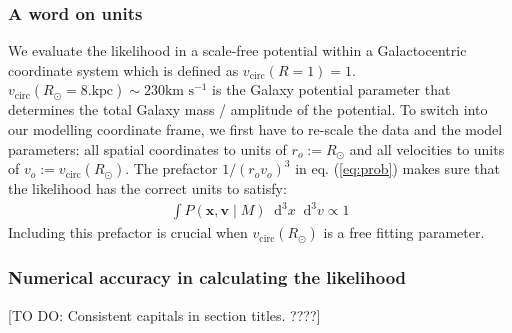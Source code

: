\documentclass[12pt,preprint]{aastex}
\newcommand{\vect}[1]{\boldsymbol{#1}} %
\newcommand*\Diff[1]{\mathop{}\!\mathrm{d^#1}}
\begin{document}
\subsubsection{A word on units}

We evaluate the likelihood in a scale-free potential within a Galactocentric coordinate system which is defined as $v_\text{circ}(R = 1) = 1$. $v_\text{circ}(R_\odot = 8. \text{kpc}) \sim 230 \text{km s$^{-1}$}$ is the Galaxy potential parameter that determines the total Galaxy mass / amplitude of the potential. To switch into our modelling coordinate frame, we first have to re-scale the data and the model parameters: all spatial coordinates to units of $r_o := R_\odot$ and all velocities to units of $v_o := v_\text{circ}(R_\odot )$. The prefactor $1/\left(r_o v_o\right)^3$ in eq. (\ref{eq:prob}) makes sure that the likelihood has the correct units to satisfy:
\begin{eqnarray*}
\int P(\vect{x},\vect{v} \mid M) \Diff 3 x \Diff 3 v \propto 1
\end{eqnarray*} 
Including this prefactor is crucial when $v_\text{circ}(R_\odot )$ is a free fitting parameter.

\subsubsection{Numerical accuracy in calculating the likelihood} \label{sec:numaccuracynormalisation}
[TO DO: Consistent capitals in section titles. ????]
\end{document}
